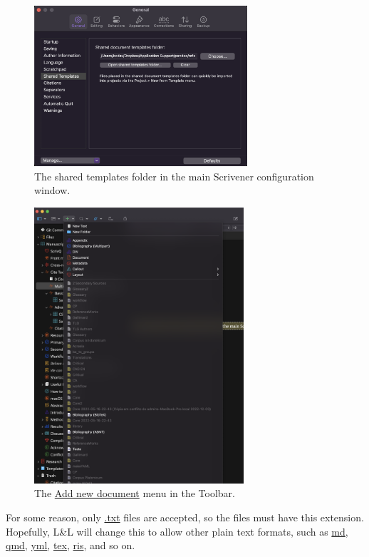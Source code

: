 \documentclass[
  12pt,
  a4paper,
  oneside,
  numbers=noenddot,
  titlepage,
  toclink=all,
  toc=bibliography]{scrbook}
\theoremstyle{definition}
\theoremstyle{definition}
\theoremstyle{definition}
\theoremstyle{plain}
\theoremstyle{plain}
\theoremstyle{plain}
\theoremstyle{plain}
\theoremstyle{plain}
\theoremstyle{remark}
\begin{document}
\begin{figure}

{\centering \includegraphics[width=3.11458in,height=2.34375in]{shared-templates.png}

}

\caption{\label{fig-scriv42A}The shared templates folder in the main
Scrivener configuration window.}

\end{figure}

\begin{figure}

{\centering \includegraphics[width=3.0625in,height=4.03125in]{create-new-file.png}

}

\caption{\label{fig-scriv42B}The \ul{Add new document} menu in the
Toolbar.}

\end{figure}

For some reason, only \ul{.txt} files are accepted, so the files must
have this extension. Hopefully, L\&L will change this to allow other
plain text formats, such as \ul{md}, \ul{qmd}, \ul{yml}, \ul{tex},
\ul{ris}, and so on.
\end{document}
